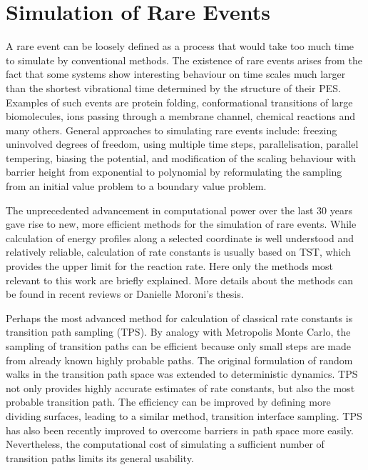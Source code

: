 \section{Simulation of Rare Events}

A rare event can be loosely defined as a process that would take too much time to simulate by conventional methods.
The existence of rare events arises from the fact that some systems show interesting behaviour on time scales much larger than the shortest vibrational time determined by the structure of their PES.
Examples of such events are protein folding, conformational transitions of large biomolecules, ions passing through a membrane channel, chemical reactions and many others.
General approaches to simulating rare events include: freezing uninvolved degrees of \mbox{freedom,\cite{Ryckaert1977, Frenkel2002}} using multiple time steps,\cite{Tuckerman1992} parallelisation,\cite{Voter1998} parallel tempering,\cite{Swendsen1986} biasing the potential,\cite{Laio2002} and modification of the scaling behaviour with barrier height from exponential to polynomial by reformulating the sampling from an initial value problem to a boundary value problem.\cite{Weinan2002b}

The unprecedented advancement in computational power over the last 30 years gave rise to new, more efficient methods for the simulation of rare events.
While calculation of energy profiles along a selected coordinate is well understood and relatively reliable,\cite{Chipot2007}
calculation of rate constants is usually based on TST, which provides the upper limit for the reaction rate.
Here only the methods most relevant to this work are briefly explained.
More details about the methods can be found in recent reviews\cite{Dellago2009, Rohrdanz2013} or Danielle Moroni's thesis.\cite{Moroni2005b}

Perhaps the most advanced method for calculation of classical rate constants is transition path sampling (TPS).\cite{Dellago1998a, Dellago1999, Bolhuis2002}
By analogy with Metropolis Monte Carlo,\cite{Metropolis1953} the sampling of transition paths can be efficient because only small steps are made from already known highly probable paths.
The original formulation of random walks in the transition path space was extended to deterministic dynamics.\cite{Bolhuis1998}
TPS not only provides highly accurate estimates of rate constants, but also the most probable transition path.
The efficiency can be improved by defining more dividing surfaces, leading to a similar method, transition interface sampling.\cite{Moroni2005a,Moroni2005b}
TPS has also been recently improved to overcome barriers in path space more easily.\cite{Borrero2010}
Nevertheless, the computational cost of simulating a sufficient number of transition paths limits its general usability.

